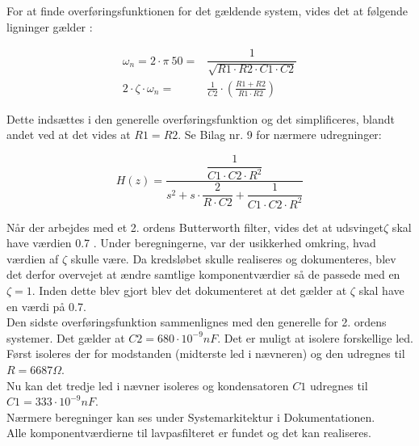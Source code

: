 For at finde overføringsfunktionen for det gældende system, vides det at følgende ligninger gælder \cite{Wikilavpas}:
\begin{ceqn}
\begin{equation}
\begin{split}
\omega_n = 2\cdot \pi\ 50 =& \dfrac{1}{\sqrt{R1\cdot R2\cdot C1\cdot C2}}\\
2\cdot \zeta\cdot\omega_n =&\frac{1}{C2}\cdot \left( \frac{R1+R2}{R1\cdot R2}\right)
\end{split}
\end{equation}
\end{ceqn}
Dette indsættes i den generelle overføringsfunktion og det simplificeres, blandt andet ved at det vides at $ R1=R2 $. 
Se Bilag nr. 9 for nærmere udregninger:
\begin{ceqn} 
\begin{equation}
H(z)=\dfrac{\dfrac{1}{C1 \cdot C2\cdot R^2}}{s^2+s\cdot \dfrac{2}{R\cdot C2}+ \dfrac{1}{C1\cdot C2\cdot R^2}}
\end{equation}
\end{ceqn}
Når der arbejdes med et 2. ordens Butterworth filter, vides det at udsvinget$ \zeta $ skal have værdien 0.7 \cite{ASB}.
Under beregningerne, var der usikkerhed omkring, hvad værdien af $ \zeta $ skulle være. Da kredsløbet skulle realiseres og dokumenteres, blev det derfor overvejet at ændre samtlige komponentværdier så de passede med en $ \zeta = 1 $. Inden dette blev gjort blev det dokumenteret at det gælder at $ \zeta $ skal have en værdi på 0.7. \\
  
Den sidste overføringsfunktion sammenlignes med den generelle for 2. ordens systemer. Det gælder at $ C2 = 680\cdot 10^{-9} nF $. Det er muligt at isolere forskellige led. Først isoleres der for modstanden (midterste led i nævneren) og den udregnes til $ R = 6687\Omega $. \\
Nu kan det tredje led i nævner isoleres og kondensatoren $ C1 $ udregnes til $ C1 = 333 \cdot 10^{-9} nF $. \\
Nærmere beregninger kan ses under Systemarkitektur i Dokumentationen. \\
Alle komponentværdierne til lavpasfilteret er fundet og det kan realiseres. \\ 

